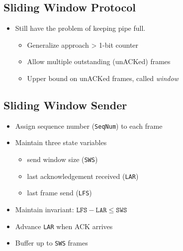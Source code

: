 \subsection{Sliding Window Protocol}
\begin{itemize}[nosep]
    \item Still have the problem of keeping pipe full.
          \begin{itemize}[nosep]
              \item Generalize approach > 1-bit counter
              \item Allow multiple outstanding (unACKed) frames
              \item Upper bound on unACKed frames, called \emph{window}
          \end{itemize}
\end{itemize}

\subsection{Sliding Window Sender}
\begin{itemize}
    \item Assign sequence number (\texttt{SeqNum}) to each frame
    \item Maintain three state variables
          \begin{itemize}[nosep]
              \item send window size (\texttt{SWS})
              \item last acknowledgement received (\texttt{LAR})
              \item last frame send (\texttt{LFS})
          \end{itemize}
    \item Maintain invariant: $\texttt{LFS} - \texttt{LAR} \leq \texttt{SWS}$
    \item Advance \texttt{LAR} when ACK arrives
    \item Buffer up to \texttt{SWS} frames
\end{itemize}

